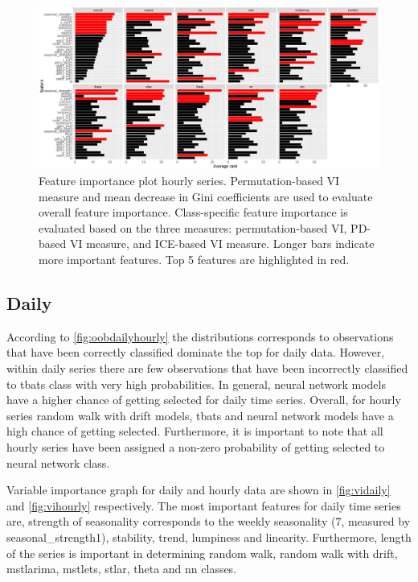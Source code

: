 \documentclass[11pt,a4paper,]{article}
\begin{document}
\begin{figure}
\centering
\includegraphics{figures/vihourly-1.png}
\caption{\label{fig:vihourly}Feature importance plot hourly series.
Permutation-based VI measure and mean decrease in Gini coefficients are
used to evaluate overall feature importance. Class-specific feature
importance is evaluated based on the three measures: permutation-based
VI, PD-based VI measure, and ICE-based VI measure. Longer bars indicate
more important features. Top 5 features are highlighted in red.}
\end{figure}

\subsection{Daily}\label{daily}

According to \autoref{fig:oobdailyhourly} the distributions corresponds
to observations that have been correctly classified dominate the top for
daily data. However, within daily series there are few observations that
have been incorrectly classified to tbats class with very high
probabilities. In general, neural network models have a higher chance of
getting selected for daily time series. Overall, for hourly series
random walk with drift models, tbats and neural network models have a
high chance of getting selected. Furthermore, it is important to note
that all hourly series have been assigned a non-zero probability of
getting selected to neural network class.

Variable importance graph for daily and hourly data are shown in
\autoref{fig:vidaily} and \autoref{fig:vihourly} respectively. The most
important features for daily time series are, strength of seasonality
corresponds to the weekly seasonality (7, measured by
seasonal\_strength1), stability, trend, lumpiness and linearity.
Furthermore, length of the series is important in determining random
walk, random walk with drift, mstlarima, mstlets, stlar, theta and nn
classes.
\end{document}
